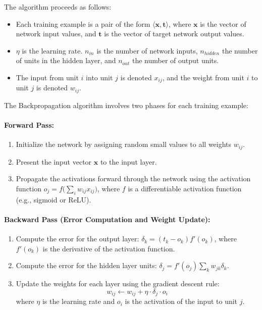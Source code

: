 \documentclass{tufte-handout}
\begin{document}
The algorithm proceeds as follows:

\begin{itemize}
    \item Each training example is a pair of the form $\langle \mathbf{x}, \mathbf{t} \rangle$, where $\mathbf{x}$ is the vector of network input values, and $\mathbf{t}$ is the vector of target network output values.
    \item $\eta$ is the learning rate. $n_{in}$ is the number of network inputs, $n_{hidden}$ the number of units in the hidden layer, and $n_{out}$ the number of output units.
    \item The input from unit $i$ into unit $j$ is denoted $x_{ij}$, and the weight from unit $i$ to unit $j$ is denoted $w_{ij}$.
\end{itemize}

The Backpropagation algorithm involves two phases for each training example:

\paragraph{Forward Pass:} 
\begin{enumerate}
    \item Initialize the network by assigning random small values to all weights $w_{ij}$.
    \item Present the input vector $\mathbf{x}$ to the input layer.
    \item Propagate the activations forward through the network using the activation function $o_j = f\big( \sum_i w_{ij} x_{ij} \big)$, where $f$ is a differentiable activation function (e.g., sigmoid or ReLU).
\end{enumerate}

\paragraph{Backward Pass (Error Computation and Weight Update):}
\begin{enumerate}
    \item Compute the error for the output layer: $\delta_k = (t_k - o_k)f'(o_k)$, where $f'(o_k)$ is the derivative of the activation function.
    \item Compute the error for the hidden layer units: $\delta_j = f'(o_j) \sum_k w_{jk} \delta_k$.
    \item Update the weights for each layer using the gradient descent rule:
    \begin{equation}
        w_{ij} \leftarrow w_{ij} + \eta \cdot \delta_j \cdot o_i
    \end{equation}
    where $\eta$ is the learning rate and $o_i$ is the activation of the input to unit $j$.
\end{enumerate}
\end{document}
